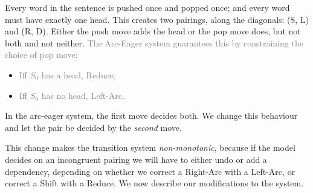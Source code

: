 \documentclass[11pt,letterpaper]{article}
\newcommand{\maybe}[1]{\textcolor{gray}{#1}}
\begin{document}
Every word in the sentence is pushed once and popped once; and every
word must have exactly one head. This creates two pairings, along the
diagonals: (S, L) and (R, D).
Either the push move adds the head or the pop move does, but not both and not neither.
\maybe{
The Arc-Eager system guarantees this by constraining the choice of pop move:}

\begin{itemize}\setlength{\itemsep}{-2mm}
   \item \maybe{ Iff $S_0$ has a head, Reduce;}
   \item \maybe{ Iff $S_0$ has no head, Left-Arc.}
 \end{itemize}
In the arc-eager system, the first move decides both.
We change this behaviour and let the pair be decided by the \emph{second} move.

This change makes the transition system \emph{non-monotonic}, because if the model decides
on an incongruent pairing
we will have to either undo or add a
dependency, depending on whether we correct a Right-Arc with a Left-Arc, or correct
a Shift with a Reduce. We now describe our modifications to the system.


\end{document}
